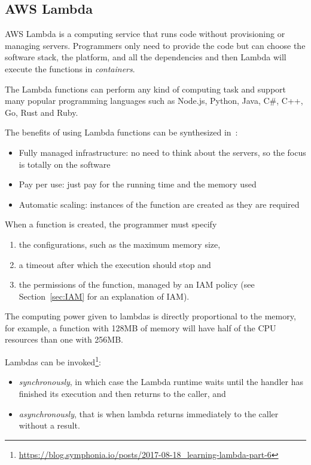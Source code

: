 \subsection{AWS Lambda}
\label{sec:lambda}
AWS Lambda is a computing service that runs code without provisioning or managing servers.
Programmers only need to provide the code but can choose
the software stack, the platform, and all the dependencies and then Lambda will execute the functions in
\textit{containers}.


The Lambda functions can perform any kind of computing task and support many popular programming languages such as Node.js, Python, Java, C\#, C++, Go, Rust and Ruby.

The benefits of using Lambda functions can be synthesized
in~\cite{poccia2016aws}:
\begin{itemize}
  \item Fully managed infrastructure: no need to think about the servers, so the focus is totally on the software
  \item Pay per use: just pay for the running time and the memory used
  \item Automatic scaling: instances of the function are created as they are required
\end{itemize}
When a function is created, the programmer must specify
\begin{enumerate}
\item the configurations, such as the maximum memory size, 
\item a timeout after which the execution should stop and 
\item the permissions of the function, managed by an IAM
  policy (see Section~\ref{sec:IAM} for an explanation of IAM).
\end{enumerate}

The computing power given to lambdas is directly proportional to the
memory, for example, a function with 128MB of memory will have half of
the CPU resources than one with 256MB.

Lambdas can be invoked\footnote{\url{https://blog.symphonia.io/posts/2017-08-18_learning-lambda-part-6}}:
\begin{itemize}
\item \textit{synchronously}, in which case the Lambda runtime waits
  until the handler has finished its execution and then returns to the
  caller, and
\item \textit{asynchronously}, that is when lambda returns immediately to the caller without a result.
\end{itemize}

